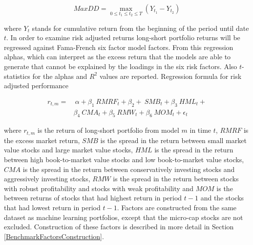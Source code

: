 \documentclass{article}
\begin{document}
\begin{equation}
\label{eq:maxDD}
MaxDD = \max\limits_{0\leq t_1\leq t_2\leq T} (Y_{t_1} - Y_{t_2})
\end{equation}

where $Y_t$ stands for cumulative return from the beginning of the period until date $t$. In order to examine risk adjusted returns long-short portfolio returns will be regressed against Fama-French \citeyear{FAMA20151} six factor model factors\footnotemark. From this regression alphas, which can interpret as the excess return that the models are able to generate that cannot be explained by the loadings in the six risk factors. Also $t$-statistics for the alphas and $R^2$ values are reported. Regression formula for risk adjusted performance \par

\begin{equation}
\label{eq:FFRegFormula}
\begin{split}
r_{t, m} = 	& \ \alpha+ \beta_{1} \ RMRF_{t} + \beta_{2} + \ SMB_{t} + \beta_{3} \ HML_{t} + \\
		&  \beta_{4} \ CMA_{t} +  \beta_{5} \ RMW_{t} + \beta_{6} \ MOM_{t} + \epsilon_{t}
\end{split}
\end{equation}

where $r_{t, m}$ is the return of long-short portfolio from model $m$ in time $t$, $RMRF$ is the excess market return, $SMB$ is the spread in the return between small market value stocks and large market value stocks, $HML$ is the spread in the return between high book-to-market value stocks and low book-to-market value stocks, $CMA$ is the spread in the return between conservatively investing stocks and aggressively investing stocks, $RMW$ is the spread in the return between stocks with robust profitability and stocks with weak profitability and $MOM$ is the between returns of stocks that had highest return in period $t-1$ and the stocks that had lowest return in period $t-1$. Factors are constructed from the same dataset as machine learning portfolios, except that the micro-cap stocks are not excluded. Construction of these factors is described in more detail in Section \ref{BenchmarkFactorsConstruction}. \par

\end{document}

